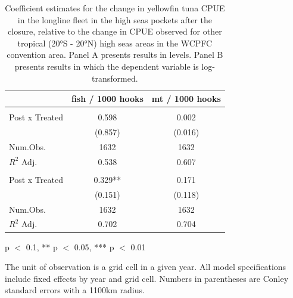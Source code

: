 \begin{table}
\centering
\begin{threeparttable}
\small
\caption{\label{tab:h2_reg_yft}Coefficient estimates for the change in yellowfin
             tuna CPUE in the longline fleet in the high seas pockets after
             the closure, relative to the change in CPUE observed for other tropical
             (20°S - 20°N) high seas areas in the WCPFC convention area.
             Panel A presents results in levels. Panel B presents results in
             which the dependent variable is log-transformed.}
\centering
\begin{tabular}[t]{lcc}
\toprule
  & fish / 1000 hooks & mt / 1000 hooks\\
\midrule
\addlinespace[0.5em]
\multicolumn{3}{l}{\textit{A) Levels}}\\
\midrule \hspace{1em}Post x Treated & 0.598 & 0.002\\
\hspace{1em} & (0.857) & (0.016)\\
\hspace{1em}Num.Obs. & 1632 & \vphantom{1} 1632\\
\hspace{1em}$R^2$ Adj. & 0.538 & 0.607\\
\addlinespace[0.5em]
\multicolumn{3}{l}{\textit{B) Log-transformed}}\\
\midrule \hspace{1em}Post x Treated & 0.329** & 0.171\\
\hspace{1em} & (0.151) & (0.118)\\
\hspace{1em}Num.Obs. & 1632 & 1632\\
\hspace{1em}$R^2$ Adj. & 0.702 & 0.704\\
\bottomrule
\end{tabular}
\begin{tablenotes}
\small
\item * p $<$ 0.1, ** p $<$ 0.05, *** p $<$ 0.01
\item The unit of observation is a grid cell in a given year. All model specifications include fixed effects by year and grid cell. Numbers in parentheses are Conley standard errors with a 1100km radius.
\end{tablenotes}
\end{threeparttable}
\end{table}
